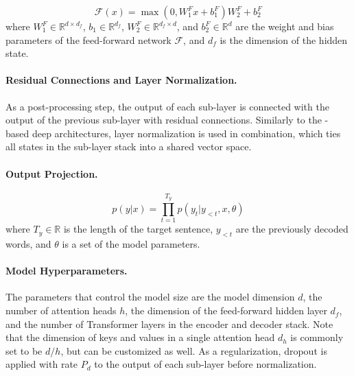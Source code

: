 \begin{equation}
  \mathcal{F}(x) = \max(0, W_1^Fx + b_1^F)W_2^F + b_2^F
\end{equation}
where $W_1^F \in \mathbb{R}^{d \times d_f}$, $b_1 \in \mathbb{R}^{d_f}$,
$W_2^F \in \mathbb{R}^{d_f \times d}$, and $b_2^F \in \mathbb{R}^d$ are the
weight and bias parameters of the feed-forward network $\mathcal{F}$, and $d_f$
is the dimension of the hidden state.

\paragraph{Residual Connections and Layer Normalization.} As a post-processing
step, the output of each sub-layer is connected with the output of the previous
sub-layer with residual connections.  Similarly to the
-based deep architectures, layer normalization is used in
combination, which ties all states in the sub-layer stack into a shared vector
space.

\paragraph{Output Projection.}


%
\begin{equation}
  p(y|x) = \prod_{t=1}^{T_y}p(y_t|y_{<t},x,\theta)
  \label{eq:output-distribution}
\end{equation}
%
where $T_y \in \mathbb{R}$ is the length of the target sentence, $y_{<t}$ are
the previously decoded words, and $\theta$ is a set of the model parameters.


\paragraph{Model Hyperparameters.} The parameters that control the model size
are the model dimension $d$, the number of attention heads $h$, the dimension
of the feed-forward hidden layer $d_f$, and the number of Transformer layers in
the encoder and decoder stack. Note that the dimension of keys and values in a
single attention head $d_h$ is commonly set to be $d / h$, but can be
customized as well.  As a regularization, dropout \citep{srivastava2014dropout}
is applied with rate $P_d$ to the output of each sub-layer before
normalization.

